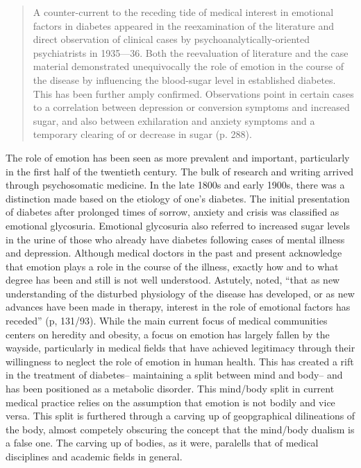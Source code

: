 \documentclass[12pt]{article}
\begin{document}
\begin{singlespace}
  \begin{quote} 
A counter-current to the receding tide of medical interest in emotional factors in diabetes appeared in the reexamination of the literature and direct observation of 
clinical cases by psychoanalytically-oriented psychiatrists in 1935—36. Both the reevaluation of literature and the case material demonstrated unequivocally the role of 
emotion in the course of the disease by influencing the blood-sugar level in established diabetes. This has been further amply confirmed. Observations point in certain cases 
to a correlation between depression or conversion symptoms and increased sugar, and also between exhilaration and anxiety symptoms and a temporary clearing of or decrease
in sugar (p. 288).\end{quote} 
    \end{singlespace}

The role of emotion has been seen as more prevalent and important, particularly in the first half of the twentieth century. The bulk of research and writing arrived through psychosomatic medicine. In the late 1800s and early 1900s, there was a distinction made based on the etiology of one's diabetes. The initial presentation of diabetes after prolonged times of sorrow, anxiety and crisis was classified as emotional glycosuria. Emotional glycosuria also referred to increased sugar levels in the urine of those who already have diabetes following cases of mental illness and depression. Although medical doctors in the past and present acknowledge that emotion plays a role in the course of the illness, exactly how and to what degree has been and still is not well understood. Astutely, \citet{burch_1962_role} noted, ``that as new understanding of the disturbed physiology of the disease has developed, or as new advances have been made in therapy, interest in the role of emotional factors has receded'' (p, 131/93). While the main current focus of medical communities centers on heredity and obesity, a focus on emotion has largely fallen by the wayside, particularly in medical fields that have achieved legitimacy through their willingness to neglect the role of emotion in human health. This has created a rift in the treatment of diabetes-- maintaining a split between mind and body-- and has been positioned as a metabolic disorder. This mind/body split in current medical practice relies on the assumption that emotion is not bodily and vice versa. 
This split is furthered through a carving up of geopgraphical dilineations of the body, almost competely obscuring the concept that the mind/body dualism is a false one. The carving up of bodies, as it were, paralells that of medical disciplines and academic fields in general. 
\end{document}
